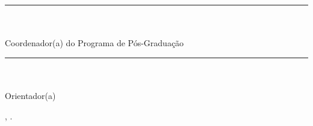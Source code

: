 {    \begin{Center}
        \vspace{1cm}
        \rule{6.5cm}{1pt}\\
        \coordenadorTitulacao\space \coordenador\\
        Coordenador(a) do Programa de Pós-Graduação

        \vspace{1cm}
        \rule{6.5cm}{1pt}\\
        \orientadorTitulacao\space \orientador\\
        Orientador(a)

        \vspace{\fill}
        \cidadeDefesa, \anoEntrega.
    \end{Center}
}

\OnesideTwoside{\clearpage}{\cleardoublepage}